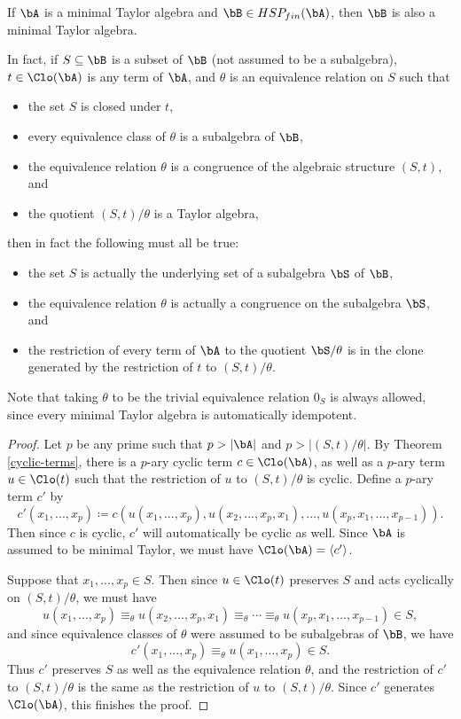 \begin{thm}\label{minimal-taylor-subalg} If $\bA$ is a minimal Taylor algebra and $\bB \in HSP_{fin}(\bA)$, then $\bB$ is also a minimal Taylor algebra.

In fact, if $S \subseteq \bB$ is a subset of $\bB$ (not assumed to be a subalgebra), $t \in \Clo(\bA)$ is any term of $\bA$, and $\theta$ is an equivalence relation on $S$ such that
\begin{itemize}
\item the set $S$ is closed under $t$,
\item every equivalence class of $\theta$ is a subalgebra of $\bB$,
\item the equivalence relation $\theta$ is a congruence of the algebraic structure $(S,t)$, and
\item the quotient $(S,t)/\theta$ is a Taylor algebra,
\end{itemize}
then in fact the following must all be true:
\begin{itemize}
\item the set $S$ is actually the underlying set of a subalgebra $\bS$ of $\bB$,
\item the equivalence relation $\theta$ is actually a congruence on the subalgebra $\bS$, and
\item the restriction of every term of $\bA$ to the quotient $\bS/\theta$ is in the clone generated by the restriction of $t$ to $(S,t)/\theta$.
\end{itemize}
Note that taking $\theta$ to be the trivial equivalence relation $0_S$ is always allowed, since every minimal Taylor algebra is automatically idempotent.
\end{thm}
\begin{proof} Let $p$ be any prime such that $p > |\bA|$ and $p > |(S,t)/\theta|$. By Theorem \ref{cyclic-terms}, there is a $p$-ary cyclic term $c \in \Clo(\bA)$, as well as a $p$-ary term $u \in \Clo(t)$ such that the restriction of $u$ to $(S,t)/\theta$ is cyclic. Define a $p$-ary term $c'$ by
\[
c'(x_1, ..., x_p) \coloneqq c(u(x_1, ..., x_p), u(x_2, ..., x_p, x_1), ..., u(x_p, x_1, ..., x_{p-1})).
\]
Then since $c$ is cyclic, $c'$ will automatically be cyclic as well. Since $\bA$ is assumed to be minimal Taylor, we must have $\Clo(\bA) = \langle c'\rangle$.

Suppose that $x_1, ..., x_p \in S$. Then since $u \in \Clo(t)$ preserves $S$ and acts cyclically on $(S,t)/\theta$, we must have
\[
u(x_1, ..., x_p) \equiv_\theta u(x_2, ..., x_p, x_1) \equiv_\theta \cdots \equiv_\theta u(x_p, x_1, ..., x_{p-1}) \in S,
\]
and since equivalence classes of $\theta$ were assumed to be subalgebras of $\bB$, we have
\[
c'(x_1, ..., x_p) \equiv_\theta u(x_1, ..., x_p) \in S.
\]
Thus $c'$ preserves $S$ as well as the equivalence relation $\theta$, and the restriction of $c'$ to $(S,t)/\theta$ is the same as the restriction of $u$ to $(S,t)/\theta$. Since $c'$ generates $\Clo(\bA)$, this finishes the proof.
\end{proof}

